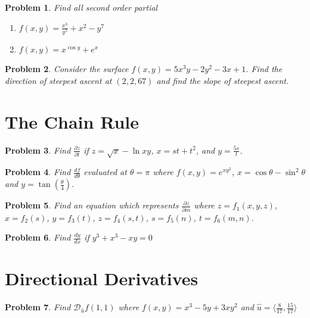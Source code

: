 \documentclass[11pt]{article}
\newtheorem{problem}{Problem}
\begin{document}
\begin{problem}
    Find all second order partial 
\begin{enumerate}
    \item $f(x,y) = \frac{x^3}{y^5}+x^2-y^7$
    \item $f(x,y) = x^{\cos{y}}+e^x$
\end{enumerate}
\end{problem}

\begin{problem}
Consider the surface $f(x,y) = 5x^3y-2y^2-3x+1$. Find the direction of steepest ascent at $(2,2,67)$ and find the slope of steepest ascent.
\end{problem}




\section{The Chain Rule}

\begin{problem}
Find $\frac{\partial z}{\partial t}$ if $z = \sqrt{x}-\ln{xy}$, $x = st+t^2$, and $y = \frac{5s}{t}$.
\end{problem}

\begin{problem}
    Find $\frac{df}{d\theta}$ evaluated at $\theta = \pi$ where $f(x,y) = e^{xy^2}$, $x = \cos{\theta}-\sin^2{\theta}$ and $y = \tan{\left(\frac{\theta}{4}\right)}$.
\end{problem}

\begin{problem}
    Find an equation which represents $\frac{\partial z}{\partial m}$ where $z = f_1(x,y,z)$, $x = f_2(s)$, $y = f_3(t)$, $z = f_4(s,t)$, $s = f_5(n)$, $t = f_6(m,n)$.
\end{problem}

\begin{problem}
    Find $\frac{dy}{dx}$ if $y^3+x^3-xy=0$
\end{problem}

\section{Directional Derivatives}

\begin{problem}
Find $\mathcal{D}_{\hat{u}} f(1,1)$ where $f(x,y) = x^3-5y+3xy^2$ and $\hat{u} = \langle \frac{8}{17}, \frac{15}{17}\rangle $    
\end{problem}
\end{document}
